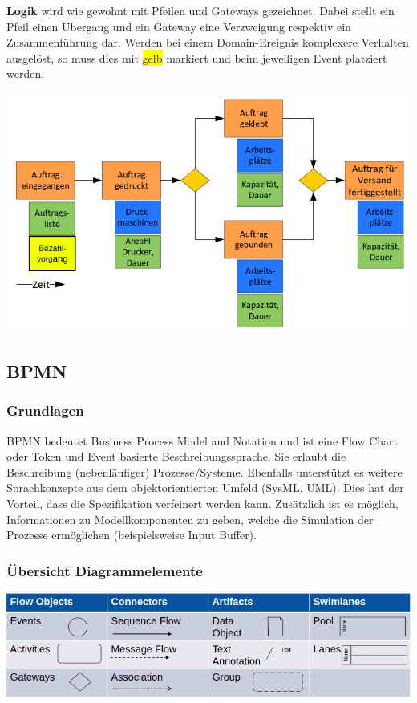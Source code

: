 \item \textbf{Logik} wird wie gewohnt mit Pfeilen und Gateways gezeichnet. Dabei stellt ein Pfeil einen Übergang und ein Gateway eine Verzweigung respektiv ein Zusammenführung dar. Werden bei einem Domain-Ereignis komplexere Verhalten ausgelöst, so muss dies mit \colorbox{yellow}{gelb}  markiert und beim jeweiligen Event platziert werden. 
    
\begin{minipage}[t]{1\textwidth}
    \centering
	\includegraphics[width=0.6\linewidth]{images/logik.png}
\end{minipage}

\subsection{BPMN}
\subsubsection{Grundlagen}
BPMN bedeutet Business Process Model and Notation und ist eine Flow Chart oder Token und Event basierte Beschreibungssprache. Sie erlaubt die Beschreibung (nebenläufiger) Prozesse/Systeme.
Ebenfalls unterstützt es weitere Sprachkonzepte aus dem objektorientierten Umfeld (SysML, UML). Dies hat der Vorteil, dass die Spezifikation verfeinert werden kann. Zusätzlich ist es möglich, Informationen zu Modellkomponenten zu geben, welche die Simulation der Prozesse ermöglichen (beispielsweise Input Buffer). 

\subsubsection{Übersicht Diagrammelemente}
\begin{minipage}[t]{1\textwidth}
    \centering
	\includegraphics[width=0.8\linewidth]{images/BPMN_diagrammelemente.png}
\end{minipage}

